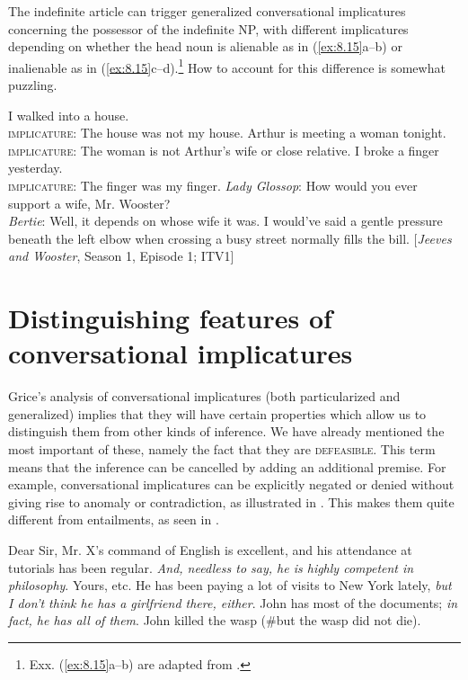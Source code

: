 The indefinite article can trigger generalized conversational implicatures concerning the possessor of the indefinite NP, with different implicatures depending on whether the head noun is alienable as in (\ref{ex:8.15}a--b) or inalienable as in (\ref{ex:8.15}c--d).\footnote{Exx. (\ref{ex:8.15}a--b) are adapted from \citet[56]{Grice1975}.} How to account for this difference is somewhat puzzling.


\ea \label{ex:8.15}
\ea  I walked into a house.\\
\textsc{implicature}: The house was not my house.
\ex Arthur is meeting a woman tonight.\\
\textsc{implicature}: The woman is not Arthur’s wife or close relative.
 \ex   I broke a finger yesterday.\\
\textsc{implicature}: The finger was my finger.
\ex  \textit{Lady Glossop}: How would you ever support a wife, Mr. Wooster?\\
\textit{Bertie}: Well, it depends on whose wife it was. I would’ve said a gentle pressure beneath the left elbow when crossing a busy street normally fills the bill. 
[\textit{Jeeves and Wooster}, Season 1, Episode 1; ITV1]
\z
\z


\section{Distinguishing features of conversational implicatures}\label{sec:8.5}

Grice’s analysis of conversational implicatures (both particularized and generalized) implies that they will have certain properties which allow us to distinguish them from other kinds of inference. We have already mentioned the most important of these, namely the fact that they are \textsc{defeasible}. This term means that the inference can be cancelled by adding an additional premise. For example, conversational implicatures can be explicitly negated or denied without giving rise to anomaly or contradiction, as illustrated in . This makes them quite different from entailments, as seen in .


\ea \label{ex:8.17}
\ea  Dear Sir, Mr. X’s command of English is excellent, and his attendance at tutorials has been regular. \textit{And, needless to say, he is highly competent in philosophy}. Yours, etc.
\ex He has been paying a lot of visits to New York lately, \textit{but I don’t think he has a girlfriend there, either}.
\ex John has most of the documents; \textit{in fact, he has all of them}.
\z \z
\ea \label{ex:8.18}
John killed the wasp (\#but the wasp did not die).
\z 


